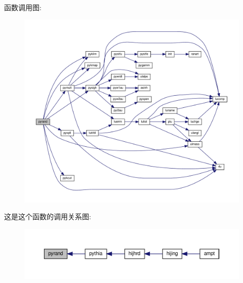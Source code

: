 函数调用图\+:
\nopagebreak
\begin{figure}[H]
\begin{center}
\leavevmode
\includegraphics[width=350pt]{pyrand_8f90_a2d74d5dd64881524212b3720af2696de_cgraph}
\end{center}
\end{figure}
这是这个函数的调用关系图\+:
\nopagebreak
\begin{figure}[H]
\begin{center}
\leavevmode
\includegraphics[width=350pt]{pyrand_8f90_a2d74d5dd64881524212b3720af2696de_icgraph}
\end{center}
\end{figure}
